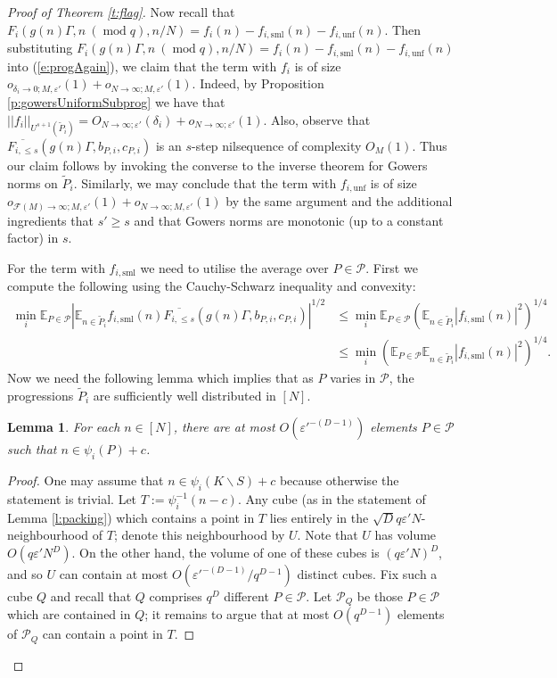 \documentclass[10pt]{article}
\def\cF{\mathcal{F}}
\def\cP{\mathcal{P}}
\def\eps{\varepsilon}
\def\E{\mathbb{E}}
\def\unf{\mathrm{unf}}
\def\sml{\mathrm{sml}}
\DeclareMathOperator\mo{mod}
\newtheorem{lemma}[firstthm]{Lemma}
\begin{document}
\begin{proof}[Proof of Theorem \ref{t:flag}]
Now recall that $F_i( g(n) \Gamma, n\ (\mo q), n/N) =  f_i(n) -  f_{i,\sml}(n) -  f_{i,\unf}(n)$. Then substituting $F_i( g(n) \Gamma, n\ (\mo q), n/N) =  f_i(n) -  f_{i,\sml}(n) -  f_{i,\unf}(n)$ into (\ref{e:progAgain}), we claim that the term with $f_i$ is of size $o_{\delta_i\to 0;M,\eps'}(1)+ o_{N\to \infty;M,\eps'}(1)$. Indeed, by Proposition \ref{p:gowersUniformSubprog} we have that $||f_i||_{U^{s+1}(\tilde P_i)} = O_{N\to \infty;\eps'}(\delta_i)+ o_{N\to \infty;\eps'}(1)$. Also, observe that $\overline{F_{i,\leq s}}( g(n) \Gamma, b_{P,i},c_{P,i})$ is an $s$-step nilsequence of complexity $O_M(1)$.  Thus our claim follows by invoking the converse to the inverse theorem for Gowers norms on $\tilde P_i$. Similarly, we may conclude that the term with $ f_{i,\unf}$ is of size $o_{\cF(M) \to \infty; M, \eps'}(1) + o_{N\to \infty;M,\eps'}(1)$ by the same argument and the additional ingredients that $s' \geq s$ and that Gowers norms are monotonic (up to a constant factor) in $s$.

For the term with $f_{i,\sml}$ we need to utilise the average over $P \in \cP$. First we compute  the following using the Cauchy-Schwarz inequality and convexity: 
\begin{align*}
\min_i \E_{P \in \cP}\left|\E_{n\in \tilde P_i} f_{i,\sml}(n)\overline{F_{i,\leq s}}( g(n) \Gamma, b_{P,i},c_{P,i})\right|^{1/2} &\leq \min_i \E_{P \in \cP}\left(\E_{n\in \tilde  P_i} | f_{i,\sml}(n)|^2\right)^{1/4} \\
&\leq \min_i \left(\E_{P \in \cP}\E_{n\in \tilde P_i} | f_{i,\sml}(n)|^2\right)^{1/4}.
\end{align*}
Now we need the following lemma which implies that as $P$ varies in $\cP$, the progressions $\tilde P_i$ are sufficiently well distributed in $[N]$. 

\begin{lemma}\label{l:gtfix}
For each $n \in [N]$, there are at most $O(\eps'^{-(D-1)})$ elements $P \in \cP$ such that $n \in \psi_i(P) + c$.
\end{lemma}
\begin{proof}
One may assume that $n \in \psi_i(K \backslash S) + c$ because otherwise the statement is trivial. Let $T:=\psi_i^{-1}(n-c)$. 
 Any cube (as in the statement of Lemma \ref{l:packing}) which contains a point in $T$ lies entirely in the $\sqrt{D}q \eps'N$-neighbourhood of $T$; denote this neighbourhood by $U$. Note that $U$ has volume $O(q\eps' N^D)$. On the other hand, the volume of one of these cubes is $(q\eps'N)^D$, and so $U$ can contain at most $O(\eps'^{-(D-1)}/q^{D-1})$ distinct cubes. Fix such a cube $Q$ and recall that $Q$ comprises $q^{D}$ different $P \in \cP$. Let $\cP_Q$ be those $P\in \cP$ which are contained in $Q$; it remains to argue that at most $O(q^{D-1})$ elements of $\cP_Q$ can contain a point in $T$. 


\end{proof}
\end{proof}
\end{document}
